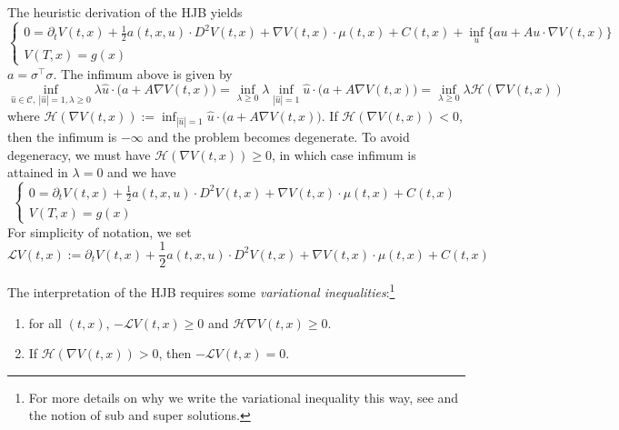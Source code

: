 \documentclass[11pt]{book}
\begin{document}
The heuristic derivation of the HJB yields
\begin{equation}
    \begin{cases}
        0=\partial_t V(t,x)+\frac12  a(t,x,u)\cdot D^2V(t,x) +\nabla V(t,x)\cdot \mu(t,x)+C(t,x)+\inf_{u}\Big\{au +
           Au\cdot \nabla V(t,x)\Big\}\\
         V(T,x)=g(x)
    \end{cases}
\end{equation}
$a=\sigma^\intercal\sigma$. The infimum above is given by 
\begin{equation}
    \inf_{\hat{u}\in\mathcal{C},~|\hat{u}|=1,\lambda\ge0}\lambda \hat{u}\cdot \big(a +
          A\nabla V(t,x)\big)=\inf_{\lambda\ge0}\lambda \inf_{|\hat{u}|=1}\hat{u}\cdot \big(a +
          A\nabla V(t,x)\big)=\inf_{\lambda\ge0}\lambda \mathcal{H}(\nabla V(t,x))
\end{equation}
where $\mathcal{H}(\nabla V(t,x)):=\inf_{|\hat{u}|=1}\hat{u}\cdot \big(a +
          A\nabla V(t,x)\big)$. If $\mathcal{H}(\nabla V(t,x))<0$, then the infimum is $-\infty$ and the problem becomes degenerate. To avoid degeneracy, we must have $\mathcal{H}(\nabla V(t,x))\ge0$, in which case infimum is attained in $\lambda=0$ and we have 
\begin{equation}
    \begin{cases}
        0=\partial_t V(t,x)+\frac12  a(t,x,u)\cdot D^2V(t,x) +\nabla V(t,x)\cdot \mu(t,x)+C(t,x)\\
         V(T,x)=g(x)
    \end{cases}
\end{equation}
For simplicity of notation, we set
\begin{equation}\label{eqn:mathcalL}
   \mathcal{L}V(t,x):=\partial_t V(t,x)+\frac12  a(t,x,u)\cdot D^2V(t,x) +\nabla V(t,x)\cdot \mu(t,x)+C(t,x)
\end{equation}          

The interpretation of the HJB requires some \textit{variational inequalities}:\footnote{For more details on why we write the variational inequality this way, see \cite[Chapter 11]{Fleming-Soner-book-06} and the  notion of sub and super solutions.}
\begin{enumerate}
    \item for all $(t,x)$, $-\mathcal{L}V(t,x)\ge0$ and $\mathcal{H}\nabla V(t,x)\ge0$.
    \item If $\mathcal{H}(\nabla V(t,x))>0$, then $-\mathcal{L}V(t,x)=0$.
\end{enumerate}
\end{document}
